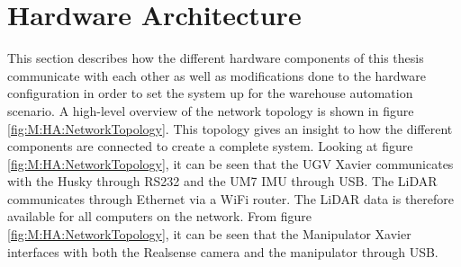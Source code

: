 

% 






  
\section{Hardware Architecture}\label{sec:M:HardwareArchitecture}
This section describes how the different hardware components of this thesis communicate with each other as well as modifications done to the hardware configuration in order to set the system up for the warehouse automation scenario. A high-level overview of the network topology is shown in figure \ref{fig:M:HA:NetworkTopology}. This topology gives an insight to how the different components are connected to create a complete system. Looking at figure \ref{fig:M:HA:NetworkTopology}, it can be seen that the UGV Xavier communicates with the Husky through RS232 and the UM7 IMU through USB. The LiDAR communicates through Ethernet via a WiFi router. The LiDAR data is therefore available for all computers on the network. From figure \ref{fig:M:HA:NetworkTopology}, it can be seen that the Manipulator Xavier interfaces with both the Realsense camera and the manipulator through USB. 


